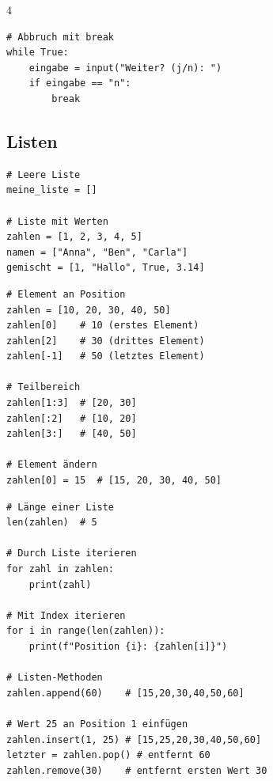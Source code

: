 \begin{landscape}
\begin{multicols*}{4}
\begin{cheatSheetBox}[title=while-Schleife]
\begin{lstlisting}
# Abbruch mit break
while True:
    eingabe = input("Weiter? (j/n): ")
    if eingabe == "n":
        break
\end{lstlisting}
		\end{cheatSheetBox}

		\columnbreak\textcolor{\cheatSheetColor}{\subsection*{Listen}}

		\begin{cheatSheetBox}[title=Listen erstellen]
			\begin{lstlisting}
# Leere Liste
meine_liste = []

# Liste mit Werten
zahlen = [1, 2, 3, 4, 5]
namen = ["Anna", "Ben", "Carla"]
gemischt = [1, "Hallo", True, 3.14]
\end{lstlisting}
		\end{cheatSheetBox}

		\begin{cheatSheetBox}[title=Auf Listen zugreifen]
			\begin{lstlisting}
# Element an Position
zahlen = [10, 20, 30, 40, 50]
zahlen[0]    # 10 (erstes Element)
zahlen[2]    # 30 (drittes Element)
zahlen[-1]   # 50 (letztes Element)

# Teilbereich
zahlen[1:3]  # [20, 30]
zahlen[:2]   # [10, 20]
zahlen[3:]   # [40, 50]

# Element ändern
zahlen[0] = 15  # [15, 20, 30, 40, 50]
\end{lstlisting}
		\end{cheatSheetBox}

		\begin{cheatSheetBox}[title=Listen verarbeiten]
			\begin{lstlisting}
# Länge einer Liste
len(zahlen)  # 5

# Durch Liste iterieren
for zahl in zahlen:
    print(zahl)

# Mit Index iterieren
for i in range(len(zahlen)):
    print(f"Position {i}: {zahlen[i]}")

# Listen-Methoden
zahlen.append(60)    # [15,20,30,40,50,60]

# Wert 25 an Position 1 einfügen
zahlen.insert(1, 25) # [15,25,20,30,40,50,60]
letzter = zahlen.pop() # entfernt 60
zahlen.remove(30)    # entfernt ersten Wert 30
\end{lstlisting}
		\end{cheatSheetBox}


\end{multicols*}
\end{landscape}
